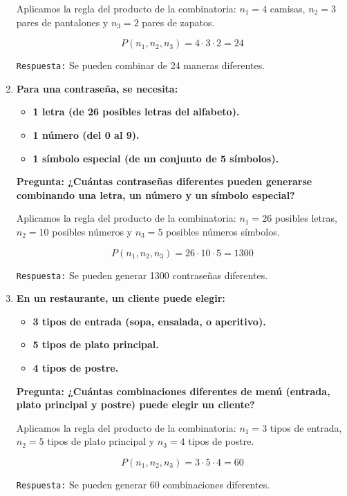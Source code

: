 \documentclass[12pt]{article}
\begin{document}
\begin{enumerate}[label=\textbf{\arabic*.}]
        Aplicamos la regla del producto de la combinatoria: $n_1 = 4$ camisas, $n_2 = 3$ pares de pantalones y $n_3 = 2$ pares de
        zapatos.

        \[P(n_1, n_2, n_3) = 4 \cdot 3 \cdot 2 = 24\]

        \texttt{Respuesta:} Se pueden combinar de 24 maneras diferentes.


        
        \item \textbf{Para una contraseña, se necesita:}
            \begin{itemize}
                \item \textbf{1 letra (de 26 posibles letras del alfabeto).}
                \item \textbf{1 número (del 0 al 9).}
                \item \textbf{1 símbolo especial (de un conjunto de 5 símbolos).}
            \end{itemize}
            \textbf{Pregunta: ¿Cuántas contraseñas diferentes pueden generarse combinando una
            letra, un número y un símbolo especial?}

            Aplicamos la regla del producto de la combinatoria: $n_1 = 26$ posibles letras, $n_2 = 10$ posibles números y $n_3 = 5$ posibles números símbolos.

            \[P(n_1, n_2, n_3) = 26 \cdot 10 \cdot 5 = 1300\]

            \texttt{Respuesta:} Se pueden generar 1300 contraseñas diferentes.
        


        \item \textbf{En un restaurante, un cliente puede elegir:}
            \begin{itemize}
                \item \textbf{3 tipos de entrada (sopa, ensalada, o aperitivo).}
                \item \textbf{5 tipos de plato principal.}
                \item \textbf{4 tipos de postre.}
            \end{itemize}
            \textbf{Pregunta: ¿Cuántas combinaciones diferentes de menú (entrada, plato principal
            y postre) puede elegir un cliente?}

            Aplicamos la regla del producto de la combinatoria: $n_1 = 3$ tipos de entrada, $n_2 = 5$ tipos de plato principal y 
            $n_3 = 4$ tipos de postre.

            \[P(n_1, n_2, n_3) = 3 \cdot 5 \cdot 4 = 60\]

            \texttt{Respuesta:} Se pueden generar 60 combinaciones diferentes.

    \end{enumerate}
\end{document}
